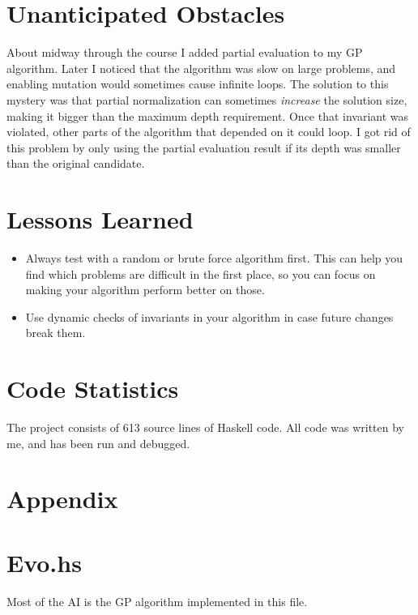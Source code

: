 \documentclass{article}
\begin{document}
\section{Unanticipated Obstacles}

About midway through the course I added partial evaluation to my GP
algorithm. Later I noticed that the algorithm was slow on large
problems, and enabling mutation would sometimes cause infinite
loops. The solution to this mystery was that partial normalization can
sometimes \textit{increase} the solution size, making it bigger than
the maximum depth requirement. Once that invariant was violated, other
parts of the algorithm that depended on it could loop. I got rid of
this problem by only using the partial evaluation result if its depth
was smaller than the original candidate.

\section{Lessons Learned}

\begin{itemize}
\item Always test with a random or brute force algorithm first. This can
help you find which problems are difficult in the first place, so you
can focus on making your algorithm perform better on those.
\item Use dynamic checks of invariants in your algorithm in case future
changes break them.
\end{itemize}

\section{Code Statistics}

The project consists of 613 source lines of Haskell code. All code was
written by me, and has been run and debugged.

\section*{Appendix}
\appendix

\section{Evo.hs}

Most of the AI is the GP algorithm implemented in this file.
\end{document}
